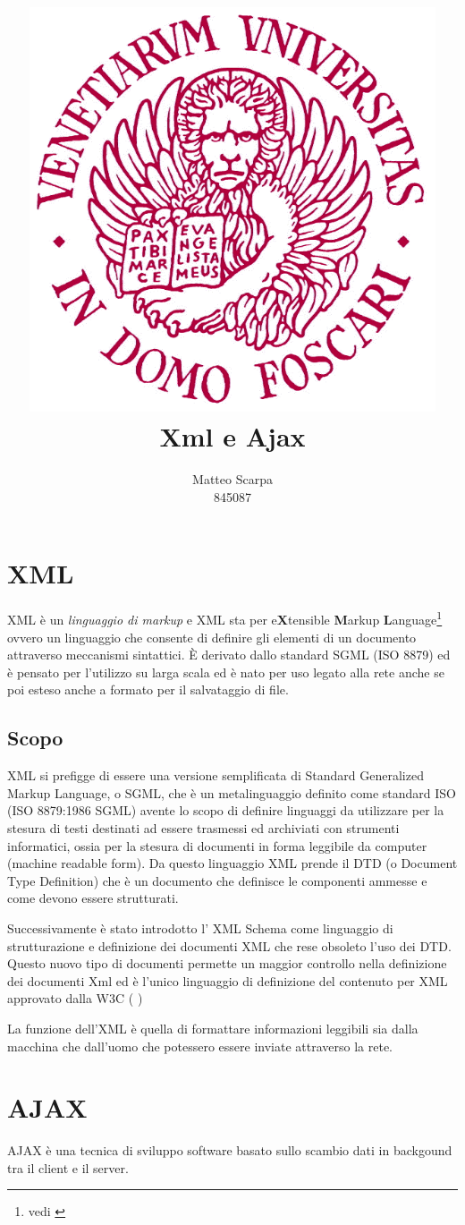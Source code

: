 \documentclass{report}
\title{\includegraphics[width=120mm]{logo-unive.png} \\ Xml e Ajax}
\author{Matteo Scarpa\\ 845087}
\date{}
\begin{document}
\maketitle

\chapter{XML}
XML è un \textit{linguaggio di markup} e XML sta per e\textbf{X}tensible \textbf{M}arkup \textbf{L}anguage\footnote{vedi \cite{site:w3cxml}} ovvero un linguaggio che consente di definire gli elementi di un documento attraverso meccanismi sintattici.
È derivato dallo standard SGML (ISO 8879) ed è pensato per l'utilizzo su larga scala ed è nato per uso legato alla rete anche se poi esteso anche a formato per il salvataggio di file.

\section{Scopo}
XML si prefigge di essere una versione semplificata di Standard Generalized Markup Language, o SGML, che è un metalinguaggio definito come standard ISO (ISO 8879:1986 SGML) avente lo scopo di definire linguaggi da utilizzare per la stesura di testi destinati ad essere trasmessi ed archiviati con strumenti informatici, ossia per la stesura di documenti in forma leggibile da computer (machine readable form). Da questo linguaggio XML prende il DTD (o Document Type Definition) che è un documento che definisce le componenti ammesse e come devono essere strutturati.

Successivamente è stato introdotto l' XML Schema come linguaggio di strutturazione e definizione dei documenti XML che rese obsoleto l'uso dei DTD. Questo nuovo tipo di documenti permette un maggior controllo nella definizione dei documenti Xml ed è l'unico linguaggio di definizione del contenuto per XML approvato dalla W3C (\cite{site:w3cxmlschame} )


La funzione dell'XML è quella di formattare informazioni leggibili sia dalla macchina che dall'uomo che potessero essere inviate attraverso la rete.

\chapter{AJAX}
AJAX è una tecnica di sviluppo software basato sullo scambio dati in backgound tra il client e il server. 

\nocite{w3c}
\printbibliography
\end{document}
